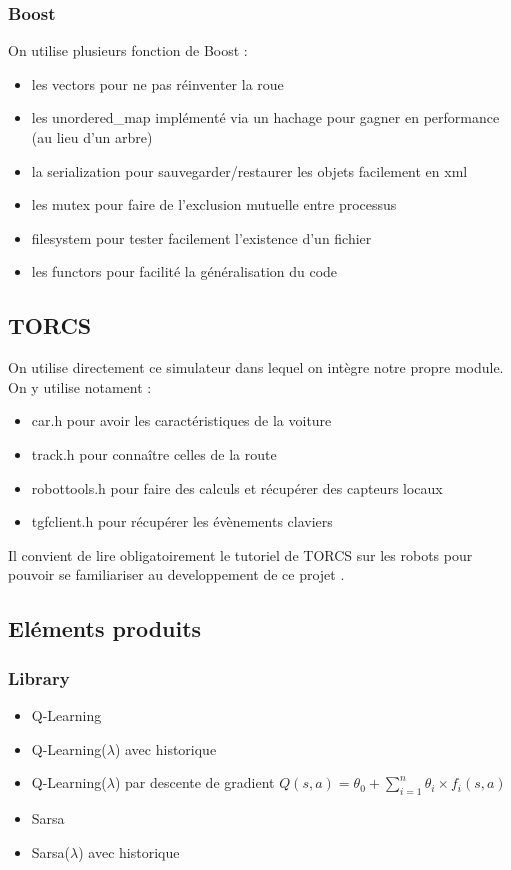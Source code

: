 \documentclass[a4paper,12pt]{article}
\begin{document}
      \subsubsection{Boost}
      On utilise plusieurs fonction de Boost :
      \begin{itemize}
       \item les vectors pour ne pas réinventer la roue
       \item les unordered\_map implémenté via un hachage pour gagner en performance (au lieu d'un arbre)
       \item la serialization pour sauvegarder/restaurer les objets facilement en xml
       \item les mutex pour faire de l'exclusion mutuelle entre processus
       \item filesystem pour tester facilement l'existence d'un fichier
       \item les functors pour facilité la généralisation du code
      \end{itemize}

      \subsection{TORCS}
      On utilise directement ce simulateur dans lequel on intègre notre propre module.\\[0.4cm]
      On y utilise notament :
      \begin{itemize}
       \item car.h pour avoir les caractéristiques de la voiture
       \item track.h pour connaître celles de la route
       \item robottools.h pour faire des calculs et récupérer des capteurs locaux
       \item tgfclient.h pour récupérer les évènements claviers
      \end{itemize}

      Il convient de lire obligatoirement le tutoriel de TORCS sur les robots pour pouvoir se familiariser au developpement
      de ce projet \cite{TORCS_Tuto}.
    \subsection{Eléments produits}
      \subsubsection{Library}
      \begin{itemize}
       \item Q-Learning 
       \item Q-Learning($\lambda$) avec historique
       \item Q-Learning($\lambda$) par descente de gradient $Q(s,a) = \theta_{0} + \sum\limits_{i=1}^n \theta_{i} \times f_{i}(s,a)$
      \end{itemize}
      \begin{itemize}
       \item Sarsa
       \item Sarsa($\lambda$) avec historique
      \end{itemize}
      
\end{document}
